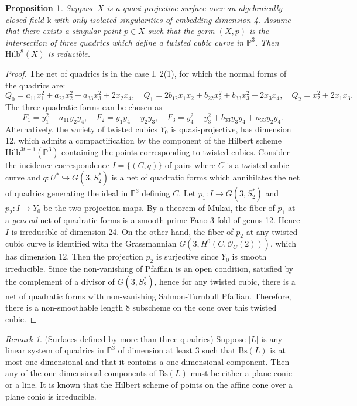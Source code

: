 \documentclass{amsart}[12pt]
\newtheorem{prop}[theorem]{Proposition}
\theoremstyle{definition}
\theoremstyle{remark}
\newtheorem{rmk}[theorem]{Remark}
\numberwithin{equation}{section}
\newcommand{\abs}[1]{\lvert#1\rvert}
\begin{document}
\begin{prop}
Suppose $X$ is a quasi-projective surface over an algebraically closed field $\mathbb{k}$ with only isolated singularities of embedding dimension 4. Assume that there exists a singular point $p \in X$ such that the germ $(X, p)$ is the intersection of three quadrics which define a twisted cubic curve in $\mathbb{P}^3$. Then $\mathrm{Hilb}^8(X)$ is reducible.
\end{prop}
\begin{proof}
The net of quadrics is in the case I. 2(1), for which the normal forms of the quadrics are:
\[ 
Q_0 = a_{11}x_1^2 + a_{22}x_2^2 + a_{33}x_3^2 + 2x_2x_4, \quad Q_1 = 2b_{12}x_1x_2 + b_{22}x_2^2 + b_{33}x_3^2 + 2x_3x_4, \quad Q_2 = x_2^2 + 2x_1x_3.
\]
The three quadratic forms can be chosen as
\[
F_1 = y_1^2 - a_{11}y_2y_4, \quad F_2 = y_1y_4 - y_2y_3, \quad F_3 = y_4^2 - y_3^2 + b_{33}y_3y_4 + a_{33}y_2y_4.
\]
Alternatively, the variety of twisted cubics $Y_0$ is quasi-projective, has dimension 12, which admits a compactification by the component of the Hilbert scheme $\mathrm{Hilb}^{3t + 1}(\mathbb{P}^3)$ containing the points corresponding to twisted cubics. Consider the incidence correspondence $I = \{(C, q)\}$ of pairs where $C$ is a twisted cubic curve and $q: U^* \hookrightarrow G(3, S_2^*)$ is a net of quadratic forms which annihilates the net of quadrics generating the ideal in $\mathbb{P}^3$ defining $C$. Let $p_1: I \to G(3, S_2^*)$ and $p_2: I \to Y_0$ be the two projection maps. By a theorem of Mukai, the fiber of $p_1$ at a \textit{general} net of quadratic forms is a smooth prime Fano 3-fold of genus 12. Hence $I$ is irreducible of dimension 24. On the other hand, the fiber of $p_2$ at any twisted cubic curve is identified with the Grassmannian $G(3, H^0(C, \mathcal{O}_C(2)))$, which has dimension 12. Then the projection $p_2$ is surjective since $Y_0$ is smooth irreducible. Since the non-vanishing of Pfaffian is an open condition, satisfied by the complement of a divisor of $G(3, S_2^*)$, hence for any twisted cubic, there is a net of quadratic forms with non-vanishing Salmon-Turnbull Pfaffian. Therefore, there is a non-smoothable length 8 subscheme on the cone over this twisted cubic. 
\end{proof}

\begin{rmk}(Surfaces defined by more than three quadrics) Suppose $\abs{L}$ is any linear system of quadrics in $\mathbb{P}^3$ of dimension at least 3 such that $\mathrm{Bs}(L)$ is at most one-dimensional and that it contains a one-dimensional component. Then any of the one-dimensional components of $\mathrm{Bs}(L)$ must be either a plane conic or a line. It is known that the Hilbert scheme of points on the affine cone over a plane conic is irreducible. 
\end{rmk}
\end{document}
